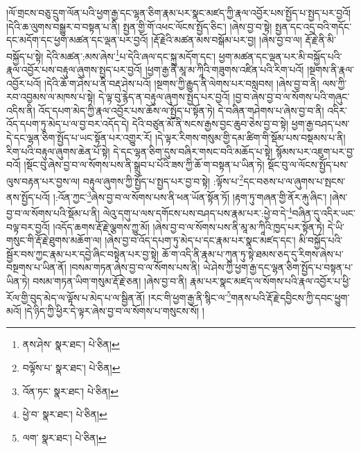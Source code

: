 །ལོ་གྲངས་བཅུ་དྲུག་ལོན་པའི་ཕྱག་རྒྱ་དང་ལྷན་ཅིག་རྣམ་པར་སྣང་མཛད་ཀྱི་རྣལ་འབྱོར་པས་སྤྱོད་པ་སྤྱད་པར་བྱའོ། །དེའི་ཆ་ལུགས་བསྒྱུར་བ་བསྟན་པ་ནི། སྤྱན་གྱི་གོ་འཕང་ལོངས་སྤྱོད་ཅིང་། །ཞེས་བྱ་བ་སྟེ། སྤྱན་དང་འདྲ་བའི་གདོང་དང་མདོག་དང་ཕྱག་མཚན་དང་ལྡན་པར་བྱའོ། །རྡོ་རྗེའི་མཚན་མས་བསྒོམ་པར་བྱ། །ཞེས་བྱ་བ་ལ། རྡོ་རྗེ་ནི་མི་བསྐྱོད་པ་སྟེ། དེའི་མཚན་:མས་ཞེས་\footnote{ནས་ཤེས་  སྣར་ཐང་།  པེ་ཅིན། }པ་དེའི་ཞལ་དང་སྐུ་མདོག་དང་། ཕྱག་མཚན་དང་ལྡན་པར་མི་བསྐྱོད་པའི་རྣལ་འབྱོར་པས་བརྟུལ་ཞུགས་སྤྱད་པར་བྱའོ། །ཕྱག་རྒྱ་ནི་མཱ་མ་ཀཱིའི་གཟུགས་འཛིན་པའི་རིག་པའོ། །སྔགས་ནི་རྣལ་འབྱོར་པའོ། །དེའི་ཆོ་ག་ཤེས་པ་ནི་བརྡ་ཤེས་པའོ། །སྔགས་ཀྱི་རྒྱུད་ནི་ལེགས་པར་བསླབས། །ཞེས་བྱ་བ་ནི། ལས་ཀྱི་རབ་འབྱམས་ལ་མཁས་པ་སྟེ། དེ་ལྟ་བུ་རྙེད་ན་བརྟུལ་ཞུགས་སྤྱད་པར་བྱའོ། །བྱ་བ་ཞེས་བྱ་བ་ལ་སོགས་པའི་གཞུང་འདིས་ནི། འོད་དཔག་མེད་ཀྱི་རྣལ་འབྱོར་པས་ཆོས་ལ་སྤྱོད་པ་སྟོན་ཏེ། དེ་བཞིན་གཤེགས་པ་ཞེས་བྱ་བ་ནི། འདིར་འོད་དཔག་ཏུ་མེད་པ་ལ་བྱ་བར་འདོད་དེ། དེའི་བཙུན་མོ་ནི་སངས་རྒྱས་བྱང་ཆུབ་ཅེས་བྱ་བ་སྟེ། ཕྱག་རྒྱ་བཤད་པས་དེ་དང་ལྷན་ཅིག་སྤྱོད་པ་ཡང་སྟོན་པར་འགྱུར་རོ། །དེ་ལྟར་རིགས་གསུམ་གྱི་དམ་ཚིག་གི་སྡོམ་པས་བསྡམས་པ་ནི། རིག་པའི་བརྟུལ་ཞུགས་ཆེན་པོ་སྟེ། དེ་དང་ལྷན་ཅིག་དུས་བཞིར་གསང་བའི་མཆོད་པ་སྟེ། སྙོམས་པར་འཇུག་པར་བྱ་བའོ། །སྡོང་བུ་ཞེས་བྱ་བ་ལ་སོགས་པས་ནི་སྒྲུབ་པ་པོའི་ཟས་ཀྱི་ཆོ་ག་བསྟན་པ་ཡིན་ཏེ། སྡོང་བུ་ལ་ལོངས་སྤྱོད་པས་ལུས་བརྟན་པར་བྱས་ལ། བརྟུལ་ཞུགས་ཀྱི་སྤྱོད་པ་སྤྱད་པར་བྱ་བ་སྟེ། :ལྟོས་པ་\footnote{བལྟོས་པ་  སྣར་ཐང་།  པེ་ཅིན། }དང་བཅས་པ་ལ་ཞུགས་པ་སྤངས་ནས་སྤྱོད་པའོ། །:འོན་ཀྱང་\footnote{འོན་ཏང་  སྣར་ཐང་།  པེ་ཅིན། }ཞེས་བྱ་བ་ལ་སོགས་པས་ནི་ཕན་ཡོན་སྟོན་ཏོ། །རྟག་ཏུ་གཞན་གྱི་ནོར་རྐུ་ཞིང་། །ཞེས་བྱ་བ་ལ་སོགས་པའི་སྡོམ་པ་ནི། ལེའུ་དགུ་པ་ལས་དགོངས་པས་བཤད་པས་རྣམ་པར་:ཕྱེ་བ་དེ་\footnote{ཕྱེ་བ་  སྣར་ཐང་།  པེ་ཅིན། }བཞིན་དུ་འདིར་ཡང་བལྟ་བར་བྱའོ། །འདོད་ཆགས་རྡོ་རྗེ་ལྕགས་ཀྱུ་མོ། །ཞེས་བྱ་བ་ལ་སོགས་པས་ནི་མཱ་མ་ཀཱིའི་ཁྱད་པར་སྟོན་ཏེ། དེ་ཡི་གསུང་གི་རྡོ་རྗེ་ཐུགས་མཆོག་ལ། །ཞེས་བྱ་བ་འོད་དཔག་ཏུ་མེད་པ་དང་རྣམ་པར་སྣང་མཛད་དང་། མི་བསྐྱོད་པའི་སྦྱོར་བས་ཀྱང་རྣམ་པར་དབྱེ་ཞིང་བསྟེན་པར་བྱ་སྟེ། ཆོ་ག་འདི་ནི་རྣམ་པ་ཀུན་ཏུ་སྟེ་ཐམས་ཅད་དུ་རིགས་ཞེས་པ་བསྔགས་པ་ཡིན་ནོ། །བསམ་གཏན་ཞེས་བྱ་བ་ལ་སོགས་པས་ནི། ཡེ་ཤེས་ཀྱི་ཕྱག་རྒྱ་དང་ལྷན་ཅིག་སྤྱོད་པ་བསྟན་པ་ཡིན་ཏེ། བསམ་གཏན་ཡིག་གསུམ་རྡོ་རྗེ་ཅན། །ཞེས་བྱ་བ་ནི། རྣམ་པར་སྣང་མཛད་ལ་སོགས་པའི་རྣལ་འབྱོར་པ་ཕྱི་རོལ་གྱི་བུད་མེད་ལ་ལྟོས་པ་མེད་པ་ལ་སྦྱིན་ནོ། །རང་གི་ཕྱག་རྒྱ་ནི་སྙིང་ལ་\footnote{ལག་  སྣར་ཐང་།  པེ་ཅིན། }གནས་པའི་རྡོ་རྗེ་དབྱིངས་ཀྱི་དབང་ཕྱུག་མའོ། །དེ་ཉིད་ཀྱི་ཕྱིར་དེ་ལྟར་ཞེས་བྱ་བ་ལ་སོགས་པ་གསུངས་སོ། །
